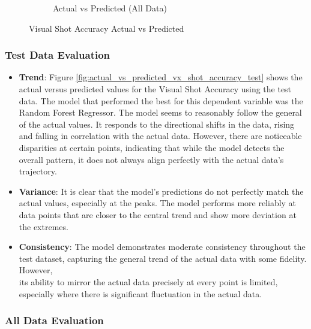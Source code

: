 \begin{figure}[htbp]
\begin{subfigure}[b]{0.49\textwidth}
        \caption{Actual vs Predicted (All Data)}
        \label{fig:actual_vs_predicted_vx_shot_accuracy_all_data}
    \end{subfigure}
    \caption{Visual Shot Accuracy Actual vs Predicted}
    \label{fig:visual_shot_accuracy_comparison}
\end{figure}

\subsubsection*{Test Data Evaluation}

\begin{itemize}
    \item \textbf{Trend}: Figure \ref{fig:actual_vs_predicted_vx_shot_accuracy_test} shows the actual versus predicted values for the Visual Shot Accuracy using the test data. The model that performed
          the best for this dependent variable was the Random Forest Regressor. The model seems to reasonably follow the general of the actual values. It responds to the directional shifts in the data,
          rising and falling in correlation with the actual data. However, there are noticeable disparities at certain points, indicating that while the model detects the overall pattern, it does not always align
          perfectly with the actual data's trajectory.
    \item \textbf{Variance}: It is clear that the model's predictions do not perfectly match the actual values, especially at the peaks. The model performs
          more reliably at data points that are closer to the central trend and show more deviation at the extremes.
    \item \textbf{Consistency}: The model demonstrates moderate consistency throughout the test dataset, capturing the general trend of the actual data with some fidelity. However, \\
          its ability to mirror the actual data precisely at every point is limited, especially where there is significant fluctuation in the actual data.

\end{itemize}

\subsubsection*{All Data Evaluation}

